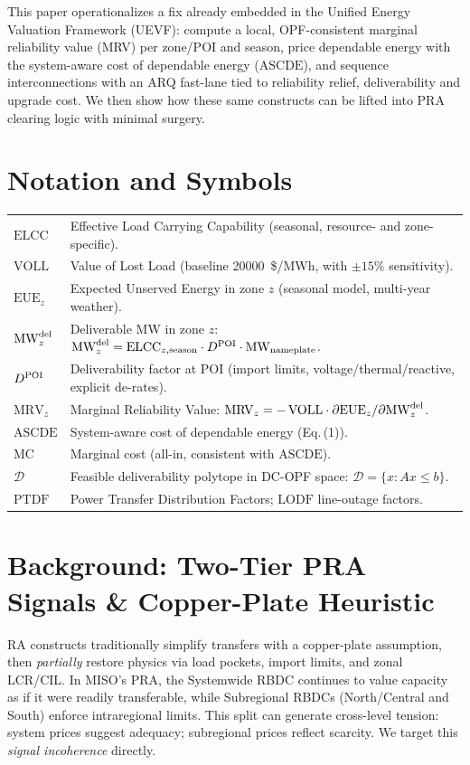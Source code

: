 \documentclass[11pt]{article}
\newcommand{\ELCC}{\ensuremath{\mathrm{ELCC}}}
\newcommand{\VOLL}{\ensuremath{\mathrm{VOLL}}}
\newcommand{\EUE}{\ensuremath{\mathrm{EUE}}}
\newcommand{\ASCDE}{\ensuremath{\mathrm{ASCDE}}}
\newcommand{\MRV}{\ensuremath{\mathrm{MRV}}}
\newcommand{\MC}{\ensuremath{\mathrm{MC}}}
\numberwithin{equation}{section}
\theoremstyle{definition}
\theoremstyle{remark}
\begin{document}
This paper operationalizes a fix already embedded in the Unified Energy Valuation Framework (UEVF): compute a local, OPF-consistent marginal reliability value (MRV) per zone/POI and season, price dependable energy with the system-aware cost of dependable energy (\ASCDE), and sequence interconnections with an ARQ fast-lane tied to reliability relief, deliverability and upgrade cost. We then show how these same constructs can be lifted into PRA clearing logic with minimal surgery.

\section{Notation and Symbols}
\label{sec:notation}
\renewcommand{\arraystretch}{1.18}
\begin{tabularx}{\textwidth}{@{} l X @{}}
\toprule
\(\ELCC\) & Effective Load Carrying Capability (seasonal, resource- and zone-specific).\\
\(\VOLL\) & Value of Lost Load (baseline \SI{20000}{\$/MWh}, with \(\pm 15\%\) sensitivity).\\
\(\EUE_z\) & Expected Unserved Energy in zone \(z\) (seasonal model, multi-year weather).\\
\(\MWdel_z\) & Deliverable MW in zone \(z\): \(\MWdel_z=\ELCC_{z,\text{season}}\cdot \Ddel \cdot \mathrm{MW}_{\text{nameplate}}\).\\
\(\Ddel\) & Deliverability factor at POI (import limits, voltage/thermal/reactive, explicit de-rates).\\
\(\MRV_z\) & Marginal Reliability Value: \(\MRV_z = -\,\VOLL\cdot \partial \EUE_z/\partial \MWdel_z\).\\
\(\ASCDE\) & System-aware cost of dependable energy (Eq.\,(1)).\\
\(\MC\) & Marginal cost (all-in, consistent with \ASCDE).\\
\(\mathcal{D}\) & Feasible deliverability polytope in DC-OPF space: \(\mathcal D=\{x: A x\le b\}\).\\
\(\mathrm{PTDF}\) & Power Transfer Distribution Factors; \(\mathrm{LODF}\) line-outage factors.\\
\bottomrule
\end{tabularx}

\section{Background: Two-Tier PRA Signals \& Copper-Plate Heuristic}
RA constructs traditionally simplify transfers with a copper-plate assumption, then \emph{partially} restore physics via load pockets, import limits, and zonal LCR/CIL. In MISO's PRA, the Systemwide RBDC continues to value capacity as if it were readily transferable, while Subregional RBDCs (North/Central and South) enforce intraregional limits. This split can generate cross-level tension: system prices suggest adequacy; subregional prices reflect scarcity. We target this \emph{signal incoherence} directly.
\end{document}
